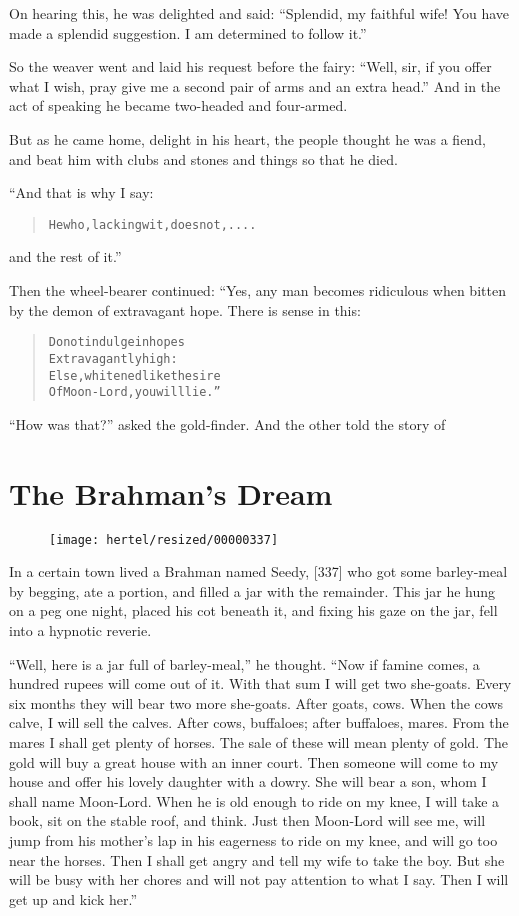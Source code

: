 \documentclass[article, twoside, 10pt]{memoir}
\renewenvironment{verbatim}{%
\begin{quote}%
\vskip -10pt%
\begin{alltt}\normalfont\small}{\end{alltt}%
\end{quote}%
\vskip -10pt
} %
\begin{document}
On hearing this, he was delighted and said:
``Splendid, my faithful wife! You have made a splendid suggestion. I am determined to follow it.''

So the weaver went and laid his request before the fairy:
``Well, sir, if you offer what I wish, pray give me a second pair of arms and an extra head.''
And in the act of speaking he became two-headed and four-armed.

But as he came home, delight in his heart, the people thought he
was a fiend, and beat him with clubs and stones and things so that
he died.

“And that is why I say:

\begin{verbatim}
He who, lacking wit, does not,....
\end{verbatim}
and the rest of it.”

Then the wheel-bearer continued: “Yes, any man becomes ridiculous
when bitten by the demon of extravagant hope. There is sense in
this:

\begin{verbatim}
Do not indulge in hopes
    Extravagantly high:
Else, whitened like the sire
    Of Moon-Lord, you will lie.”
\end{verbatim}
``How was that?'' asked the gold-finder. And the other told the
story of

\chapter{The Brahman's Dream}

\begin{figure}[p]\texttt{[image: hertel/resized/00000337]}\end{figure}In a certain town lived a Brahman named Seedy, [337] who got some
barley-meal by begging, ate a portion, and filled a jar with the
remainder. This jar he hung on a peg one night, placed his cot
beneath it, and fixing his gaze on the jar, fell into a hypnotic
reverie.

``Well, here is a jar full of barley-meal,'' he thought.
``Now if famine comes, a hundred rupees will come out of it. With that sum I will get two she-goats. Every six months they will bear two more she-goats. After goats, cows. When the cows calve, I will sell the calves. After cows, buffaloes; after buffaloes, mares. From the mares I shall get plenty of horses. The sale of these will mean plenty of gold. The gold will buy a great house with an inner court. Then someone will come to my house and offer his lovely daughter with a dowry. She will bear a son, whom I shall name Moon-Lord. When he is old enough to ride on my knee, I will take a book, sit on the stable roof, and think. Just then Moon-Lord will see me, will jump from his mother's lap in his eagerness to ride on my knee, and will go too near the horses. Then I shall get angry and tell my wife to take the boy. But she will be busy with her chores and will not pay attention to what I say. Then I will get up and kick her.''
\end{document}
